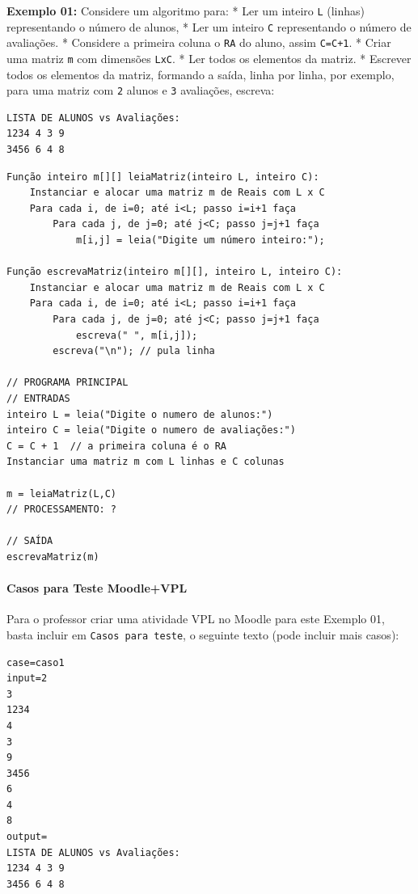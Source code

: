 \documentclass[12pt,a4paper]{article}
\begin{document}
    \textbf{Exemplo 01:} Considere um algoritmo para: * Ler um inteiro
\texttt{L} (linhas) representando o número de alunos, * Ler um inteiro
\texttt{C} representando o número de avaliações. * Considere a primeira
coluna o \texttt{RA} do aluno, assim \texttt{C=C+1}. * Criar uma matriz
\texttt{m} com dimensões \texttt{LxC}. * Ler todos os elementos da
matriz. * Escrever todos os elementos da matriz, formando a saída, linha
por linha, por exemplo, para uma matriz com \texttt{2} alunos e
\texttt{3} avaliações, escreva:

\begin{verbatim}
LISTA DE ALUNOS vs Avaliações:
1234 4 3 9
3456 6 4 8
\end{verbatim}

    \begin{verbatim}
Função inteiro m[][] leiaMatriz(inteiro L, inteiro C):
    Instanciar e alocar uma matriz m de Reais com L x C
    Para cada i, de i=0; até i<L; passo i=i+1 faça
        Para cada j, de j=0; até j<C; passo j=j+1 faça
            m[i,j] = leia("Digite um número inteiro:");

Função escrevaMatriz(inteiro m[][], inteiro L, inteiro C): 
    Instanciar e alocar uma matriz m de Reais com L x C
    Para cada i, de i=0; até i<L; passo i=i+1 faça
        Para cada j, de j=0; até j<C; passo j=j+1 faça
            escreva(" ", m[i,j]);
        escreva("\n"); // pula linha

// PROGRAMA PRINCIPAL
// ENTRADAS
inteiro L = leia("Digite o numero de alunos:")
inteiro C = leia("Digite o numero de avaliações:")
C = C + 1  // a primeira coluna é o RA
Instanciar uma matriz m com L linhas e C colunas 

m = leiaMatriz(L,C)
// PROCESSAMENTO: ?

// SAÍDA
escrevaMatriz(m)
\end{verbatim}

    \hypertarget{casos-para-teste-moodlevpl}{%
\paragraph{Casos para Teste
Moodle+VPL}\label{casos-para-teste-moodlevpl}}

Para o professor criar uma atividade VPL no Moodle para este Exemplo 01,
basta incluir em \texttt{Casos\ para\ teste}, o seguinte texto (pode
incluir mais casos):

\begin{verbatim}
case=caso1
input=2
3
1234 
4 
3 
9
3456
6
4
8
output=
LISTA DE ALUNOS vs Avaliações:
1234 4 3 9
3456 6 4 8
\end{verbatim}
\end{document}
